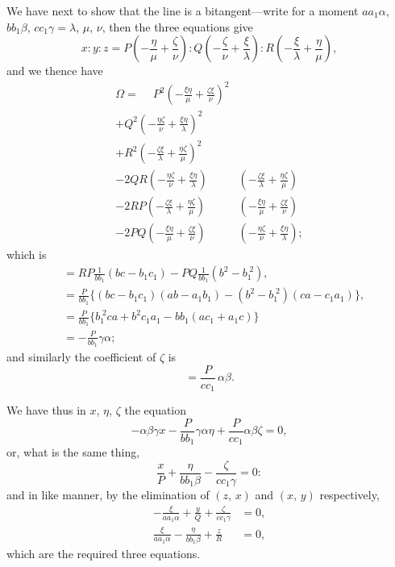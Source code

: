 \documentclass[11pt,a4paper]{article}
\theoremstyle{plain}
\theoremstyle{definition}
\theoremstyle{remark}
\begin{document}
We have next to show that the line is a bitangent---write for a moment $aa_1\alpha$, $bb_1\beta$, $cc_1\gamma = \lambda$, $\mu$, $\nu$, then the three equations give
\[
x : y : z = P\left(-\frac{\eta}{\mu} + \frac{\zeta}{\nu}\right) : Q\left(-\frac{\zeta}{\nu} + \frac{\xi}{\lambda}\right) : R\left(-\frac{\xi}{\lambda} + \frac{\eta}{\mu}\right),
\]
and we thence have
\begin{align*}
\Omega =\phantom{+} P^2\left(-\frac{\xi\eta}{\mu} + \frac{\zeta\xi}{\nu}\right)^2&\\
+ Q^2\left(-\frac{\eta\zeta}{\nu} + \frac{\xi\eta}{\lambda}\right)^2&\\
+ R^2\left(-\frac{\zeta\xi}{\lambda} + \frac{\eta\zeta}{\mu}\right)^2&\\
- 2QR\left(-\frac{\eta\zeta}{\nu} + \frac{\xi\eta}{\lambda}\right)&\left(-\frac{\zeta\xi}{\lambda} + \frac{\eta\zeta}{\mu}\right)\\
- 2RP\left(-\frac{\zeta\xi}{\lambda} + \frac{\eta\zeta}{\mu}\right)&\left(-\frac{\xi\eta}{\mu} + \frac{\zeta\xi}{\nu}\right)\\
- 2PQ\left(-\frac{\xi\eta}{\mu} + \frac{\zeta\xi}{\nu}\right)&\left(-\frac{\eta\zeta}{\nu} + \frac{\xi\eta}{\lambda}\right);
\end{align*}
which is
\begin{align*}
&= RP\frac{1}{bb_1}(bc - b_1c_1) - PQ\frac{1}{bb_1}(b^2 - b_1^{\;2}),\\
&= \frac{P}{bb_1}\{(bc - b_1c_1)(ab - a_1b_1) - (b^2 - b_1^{\;2})(ca - c_1a_1)\},\\
&= \frac{P}{bb_1}\{b_1^{\;2}ca + b^2c_1a_1 - bb_1(ac_1 + a_1c)\}\\
&= -\frac{P}{bb_1}\gamma\alpha;
\end{align*}
and similarly the coefficient of $\zeta$ is
\[
= \frac{P}{cc_1}\,\alpha\beta.
\]

We have thus in $x$, $\eta$, $\zeta$ the equation
\[
-\alpha\beta\gamma x - \frac{P}{bb_1}\gamma\alpha\eta + \frac{P}{cc_1}\alpha\beta\zeta = 0,
\]
or, what is the same thing,
\[
\frac{x}{P} + \frac{\eta}{bb_1\beta} - \frac{\zeta}{cc_1\gamma} = 0:
\]
and in like manner, by the elimination of $(z,\,x)$ and $(x,\,y)$ respectively,
\begin{align*}
-\frac{\xi}{aa_1\alpha} + \frac{y}{Q} + \frac{\zeta}{cc_1\gamma} &= 0,\\
\frac{\xi}{aa_1\alpha} - \frac{\eta}{bb_1\beta} + \frac{z}{R} &= 0,
\end{align*}
which are the required three equations.
\end{document}
